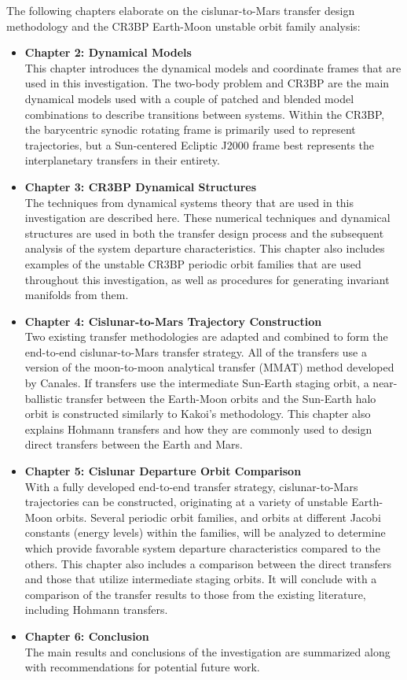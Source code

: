The following chapters elaborate on the cislunar-to-Mars transfer design methodology and the CR3BP Earth-Moon unstable orbit family
analysis:
\begin{itemize}
	\item	\textbf{Chapter 2: Dynamical Models}\\
			This chapter introduces the dynamical models and coordinate frames
			that are used in this investigation. The two-body problem and CR3BP are the main
			dynamical models used with a couple of patched and blended model combinations to
			describe transitions between systems. Within the CR3BP, the barycentric synodic
			rotating frame is primarily used to represent trajectories, but a Sun-centered Ecliptic
			J2000 frame best represents the interplanetary transfers in their entirety.
	\item	\textbf{Chapter 3: CR3BP Dynamical Structures}\\
			The techniques from dynamical systems theory that are used in this
			investigation are described here. These numerical techniques and dynamical
			structures are used in both the transfer design process and the subsequent analysis of
			the system departure characteristics. This chapter also includes examples of the
			unstable CR3BP periodic orbit families that are used throughout this investigation, as
			well as procedures for generating invariant manifolds from them.
	\item	\textbf{Chapter 4: Cislunar-to-Mars Trajectory Construction}\\
			Two existing transfer methodologies are adapted and combined to
			form the end-to-end cislunar-to-Mars transfer strategy. All of the transfers use a version
			of the moon-to-moon analytical transfer (MMAT) method developed by
			Canales\cite{Canales:2021b}. If transfers use the intermediate Sun-Earth staging orbit,
			a near-ballistic transfer between the Earth-Moon orbits and the Sun-Earth halo orbit is
			constructed similarly to Kakoi's methodology\cite{Kakoi:2015}. This chapter also explains
			Hohmann transfers and how they are commonly used to design direct transfers between the
			Earth and Mars.
	\item	\textbf{Chapter 5: Cislunar Departure Orbit Comparison}\\
			With a fully developed end-to-end transfer strategy, cislunar-to-Mars
			trajectories can be constructed, originating at a variety of unstable Earth-Moon
			orbits. Several periodic orbit families, and orbits at different Jacobi constants
			(energy levels) within the families, will be analyzed to determine which provide
			favorable system departure characteristics compared to the others. This chapter also
			includes a comparison between the direct transfers and those that utilize intermediate
			staging orbits. It will conclude with a comparison of the transfer results to those
			from the existing literature, including Hohmann transfers.
	\item	\textbf{Chapter 6: Conclusion}\\
			The main results and conclusions of the investigation are summarized
			along with recommendations for potential future work.
\end{itemize}
